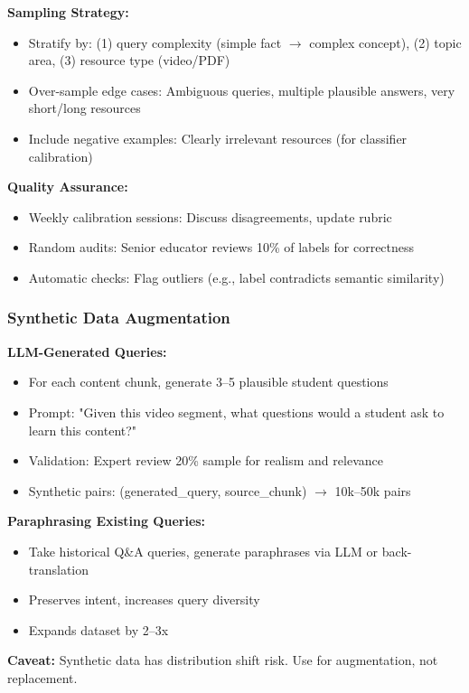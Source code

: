 \documentclass[11pt,letterpaper]{article}
\begin{document}
\textbf{Sampling Strategy:}
\begin{itemize}
\item Stratify by: (1) query complexity (simple fact $\rightarrow$ complex concept), (2) topic area, (3) resource type (video/PDF)
\item Over-sample edge cases: Ambiguous queries, multiple plausible answers, very short/long resources
\item Include negative examples: Clearly irrelevant resources (for classifier calibration)
\end{itemize}

\textbf{Quality Assurance:}
\begin{itemize}
\item Weekly calibration sessions: Discuss disagreements, update rubric
\item Random audits: Senior educator reviews 10\% of labels for correctness
\item Automatic checks: Flag outliers (e.g., label contradicts semantic similarity)
\end{itemize}

\subsubsection{Synthetic Data Augmentation}

\textbf{LLM-Generated Queries:}
\begin{itemize}
\item For each content chunk, generate 3--5 plausible student questions
\item Prompt: "Given this video segment, what questions would a student ask to learn this content?"
\item Validation: Expert review 20\% sample for realism and relevance
\item Synthetic pairs: (generated\_query, source\_chunk) $\rightarrow$ 10k--50k pairs
\end{itemize}

\textbf{Paraphrasing Existing Queries:}
\begin{itemize}
\item Take historical Q\&A queries, generate paraphrases via LLM or back-translation
\item Preserves intent, increases query diversity
\item Expands dataset by 2--3x
\end{itemize}

\textbf{Caveat:} Synthetic data has distribution shift risk. Use for augmentation, not replacement.
\end{document}
